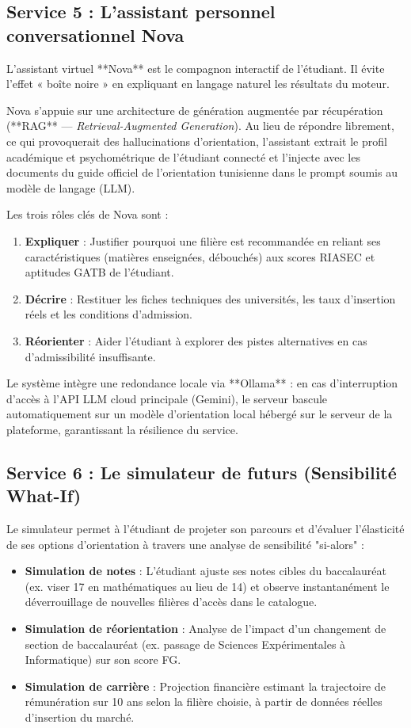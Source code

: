 \subsection{Service 5 : L'assistant personnel conversationnel Nova}

L'assistant virtuel **Nova** est le compagnon interactif de l'étudiant. Il évite l'effet « boîte noire » en expliquant en langage naturel les résultats du moteur.

Nova s'appuie sur une architecture de génération augmentée par récupération (**RAG** — \textit{Retrieval-Augmented Generation}). Au lieu de répondre librement, ce qui provoquerait des hallucinations d'orientation, l'assistant extrait le profil académique et psychométrique de l'étudiant connecté et l'injecte avec les documents du guide officiel de l'orientation tunisienne dans le prompt soumis au modèle de langage (LLM). 

Les trois rôles clés de Nova sont :
\begin{enumerate}
    \item \textbf{Expliquer} : Justifier pourquoi une filière est recommandée en reliant ses caractéristiques (matières enseignées, débouchés) aux scores RIASEC et aptitudes GATB de l'étudiant.
    \item \textbf{Décrire} : Restituer les fiches techniques des universités, les taux d'insertion réels et les conditions d'admission.
    \item \textbf{Réorienter} : Aider l'étudiant à explorer des pistes alternatives en cas d'admissibilité insuffisante.
\end{enumerate}

Le système intègre une redondance locale via **Ollama** : en cas d'interruption d'accès à l'API LLM cloud principale (Gemini), le serveur bascule automatiquement sur un modèle d'orientation local hébergé sur le serveur de la plateforme, garantissant la résilience du service.

\subsection{Service 6 : Le simulateur de futurs (Sensibilité What-If)}

Le simulateur permet à l'étudiant de projeter son parcours et d'évaluer l'élasticité de ses options d'orientation à travers une analyse de sensibilité "si-alors" :

\begin{itemize}
    \item \textbf{Simulation de notes} : L'étudiant ajuste ses notes cibles du baccalauréat (ex. viser 17 en mathématiques au lieu de 14) et observe instantanément le déverrouillage de nouvelles filières d'accès dans le catalogue.
    \item \textbf{Simulation de réorientation} : Analyse de l'impact d'un changement de section de baccalauréat (ex. passage de Sciences Expérimentales à Informatique) sur son score FG.
    \item \textbf{Simulation de carrière} : Projection financière estimant la trajectoire de rémunération sur 10 ans selon la filière choisie, à partir de données réelles d'insertion du marché.
\end{itemize}

